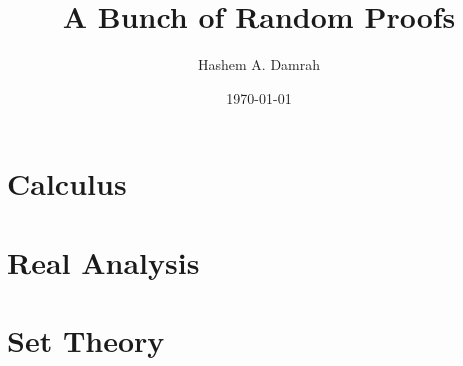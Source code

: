 \documentclass{book}
\title{A Bunch of Random Proofs}
\author{Hashem A. Damrah}
\date{\today}
\begin{document}
  \pagestyle{empty}
  \maketitle
  \newpage
  \tableofcontents
  \newpage

  \pagestyle{fancy}

  \chapter{Calculus}
  

  \newpage

  \chapter{Real Analysis}
  

  \newpage

  \chapter{Set Theory}
  
\end{document}
